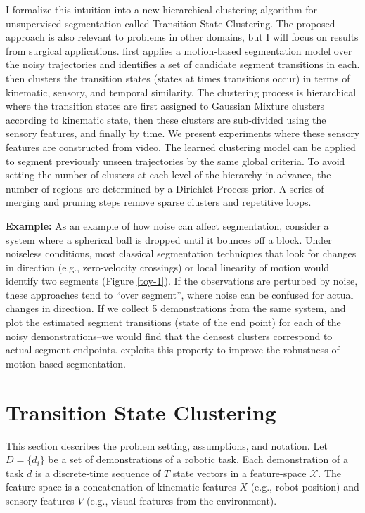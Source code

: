 I formalize this intuition into a new hierarchical clustering algorithm for unsupervised segmentation called Transition State Clustering.
The proposed approach is also relevant to problems in other domains, but I will focus on results from surgical applications.
\tsc first applies a motion-based segmentation model over the noisy trajectories and identifies a set of candidate segment transitions in each.
\tsc then clusters the transition states (states at times transitions occur) in terms of kinematic, sensory, and temporal similarity. 
The clustering process is hierarchical where the transition states are first assigned to Gaussian Mixture clusters according to kinematic state, then these clusters are sub-divided using the sensory features, and finally by time.
We present experiments where these sensory features are constructed from video.
The learned clustering model can be applied to segment previously unseen trajectories by the same global criteria.
To avoid setting the number of clusters at each level of the hierarchy in advance, the number of regions are determined by a Dirichlet Process prior.
A series of merging and pruning steps remove sparse clusters and repetitive loops.


\vspace{0.5em}

\noindent \textbf{Example: } As an example of how noise can affect segmentation, consider a system where a spherical ball is dropped until it bounces off a block.
Under noiseless conditions, most classical segmentation techniques that look for changes in direction (e.g., zero-velocity crossings) or local linearity of motion would identify two segments (Figure \ref{toy-1}).
If the observations are perturbed by noise, these approaches tend to ``over segment'', where noise can be confused for actual changes in direction.
If we collect 5 demonstrations from the same system, and
plot the estimated segment transitions (state of the end point) for each of the noisy demonstrations--we would find that the densest clusters correspond to actual segment endpoints.
\tsc exploits this property to improve the robustness of motion-based segmentation.


\section{Transition State Clustering}
This section describes the problem setting, assumptions, and notation.
Let $D=\{d_i\}$ be a set of demonstrations of a robotic task.
Each demonstration of a task $d$ is a discrete-time sequence of $T$ state vectors in a feature-space $\mathcal{X}$.
The feature space is a concatenation of kinematic features $X$ (e.g., robot position) and sensory features $V$ (e.g., visual features from the environment).


